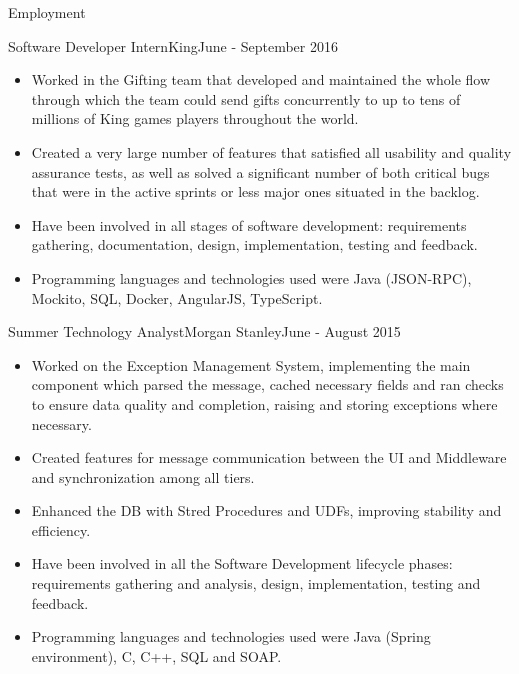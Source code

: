 \documentclass[]{cv}
\begin{document}
\begin{cvsection}{Employment}
		\begin{cvsubsection}{Software Developer Intern}{King}{June - September 2016}
			\begin{itemize}
				\item Worked in the Gifting team that developed and maintained the whole flow through which the team could send gifts concurrently to up to tens of 
					millions of King games players throughout the world.
				\item Created a very large number of features that satisfied all usability and quality assurance tests, as well as solved a significant number of 
					both critical bugs that were in the active sprints or less major ones situated in the backlog.
				\item Have been involved in all stages of software development: requirements gathering, documentation, design, implementation, testing and feedback.
				\item Programming languages and technologies used were Java (JSON-RPC), Mockito, SQL, Docker, AngularJS, TypeScript.
			\end{itemize}
		\end{cvsubsection}

		\newpage

		\begin{cvsubsection}{Summer Technology Analyst}{Morgan Stanley}{June - August 2015}
			\begin{itemize}
				\item Worked on the Exception Management System, implementing the main component which parsed the message, cached necessary fields and ran checks to ensure 
					data quality and completion, raising and storing exceptions where necessary.
				\item Created features for message communication between the UI and Middleware and synchronization among all tiers.	
				\item Enhanced the DB with Stred Procedures and UDFs, improving stability and efficiency.
				\item Have been involved in all the Software Development lifecycle phases: requirements gathering and analysis, design,
					implementation, testing and feedback.
				\item Programming languages and technologies used were Java (Spring environment), C, C++, SQL and SOAP.
			\end{itemize}
		\end{cvsubsection}


\end{cvsection}
\end{document}
